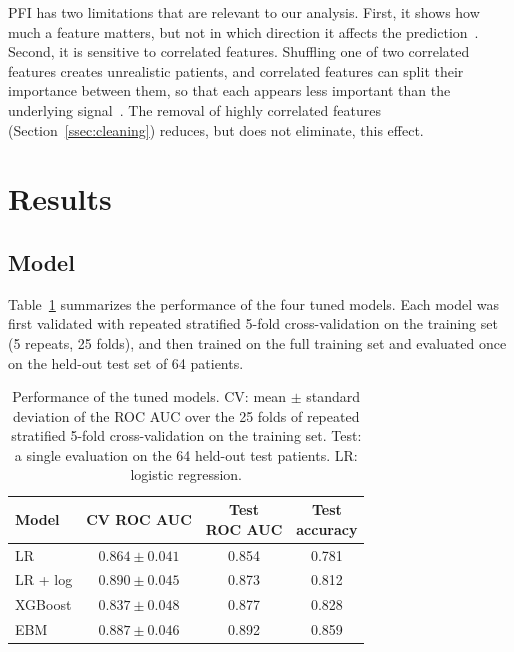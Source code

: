 \documentclass[conference]{IEEEtran}
\begin{document}
PFI has two limitations that are relevant to our analysis. First, it shows how
much a feature matters, but not in which direction it affects the
prediction~\cite{molnar2025}. Second, it is sensitive to correlated features.
Shuffling one of two correlated features creates unrealistic patients, and
correlated features can split their importance between them, so that each
appears less important than the underlying signal~\cite{molnar2025}. The
removal of highly correlated features (Section~\ref{ssec:cleaning}) reduces,
but does not eliminate, this effect.

\section{Results}
\label{sec:results}

\subsection{Model}
\label{ssec:results_model}

Table~\ref{tab:cv_results} summarizes the performance of the four tuned models.
Each model was first validated with repeated stratified 5-fold cross-validation
on the training set (5 repeats, 25 folds), and then trained on the full training
set and evaluated once on the held-out test set of 64 patients.

\begin{table}[h]
\centering
\small
\setlength{\tabcolsep}{4pt}
\caption{Performance of the tuned models. CV: mean $\pm$ standard deviation of
the ROC AUC over the 25 folds of repeated stratified 5-fold cross-validation on
the training set. Test: a single evaluation on the 64 held-out test patients.
LR: logistic regression.}
\label{tab:cv_results}
\begin{tabular}{lccc}
\toprule
Model & CV ROC AUC & \makecell{Test\\ROC AUC} & \makecell{Test\\accuracy} \\
\midrule
LR        & $0.864 \pm 0.041$ & 0.854 & 0.781 \\
LR + log  & $0.890 \pm 0.045$ & 0.873 & 0.812 \\
XGBoost   & $0.837 \pm 0.048$ & 0.877 & 0.828 \\
EBM       & $0.887 \pm 0.046$ & 0.892 & 0.859 \\
\bottomrule
\end{tabular}
\end{table}
\end{document}
